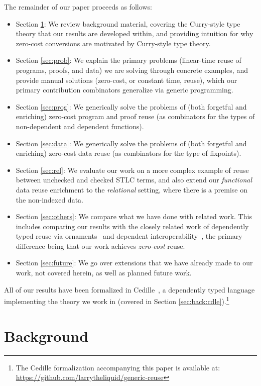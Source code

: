 \documentclass[acmsmall]{acmart}\settopmatter{}
\newcommand{\refsec}[1]{Section \ref{sec:#1}}
\newcommand{\labsec}[1]{\label{sec:#1}}
\begin{document}
The remainder of our paper proceeds as follows:
\begin{itemize}
\item{\refsec{back}:} We review background material, covering the
  Curry-style type theory that our results are developed within, and
  providing intuition for why zero-cost conversions are motivated by
  Curry-style type theory.
\item{\refsec{prob}:} We explain the primary problems
  (linear-time reuse of programs, proofs, and data) we are solving
  through concrete examples, and provide manual solutions (zero-cost,
  or constant time, reuse), which our
  primary contribution combinators generalize via generic programming.
\item{\refsec{prog}:} We generically solve the problems of
  (both forgetful and enriching) zero-cost
  program and proof reuse (as combinators for the types of non-dependent
  and dependent functions).
\item{\refsec{data}:} We generically solve the problems of
  (both forgetful and enriching) zero-cost
  data reuse (as combinators for the type of fixpoints).
\item{\refsec{rel}:} We evaluate our work on a more complex example of
  reuse between unchecked and checked STLC terms, and also extend our
  \textit{functional} data reuse enrichment to the \textit{relational}
  setting, where there is a premise on the non-indexed data.
\item{\refsec{others}: We compare what we have done with related
  work. This includes comparing our results with the closely related
  work of dependently typed reuse via
  ornaments~\cite{ornaments:original} and
  dependent interoperability~\cite{dagand:interop}, the primary
  difference being that our work achieves \textit{zero-cost} reuse.}
\item{\refsec{future}: We go over extensions that we have already made
  to our work, not covered herein, as well as planned future work.}
\end{itemize}
All of our results have been formalized in
Cedille~\cite{stump17a,stump18,lang:cedille}, a dependently typed language
implementing the theory we work in
(covered in \refsec{back:cdle}).\footnote{
  \raggedright{The Cedille formalization accompanying this paper is available at:\\
  \url{https://github.com/larrytheliquid/generic-reuse}}
}

\section{Background}
\labsec{back}
\end{document}
